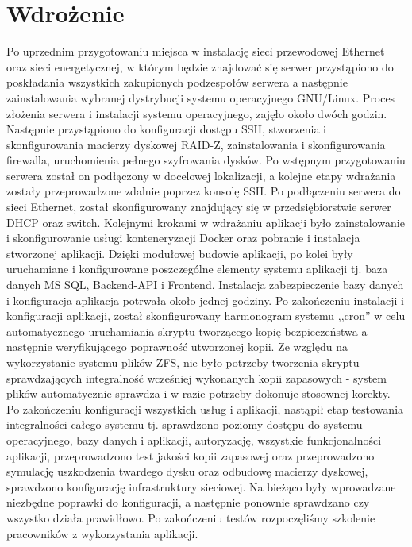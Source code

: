 \documentclass[12pt,a4paper]{article}
\begin{document}
	\section{Wdrożenie}
		\indent Po uprzednim przygotowaniu miejsca w instalację sieci przewodowej Ethernet oraz sieci energetycznej, w którym będzie znajdować się serwer  przystąpiono
		do poskładania wszystkich zakupionych podzespołów serwera a następnie zainstalowania wybranej dystrybucji systemu operacyjnego GNU/Linux. Proces złożenia serwera i instalacji
		systemu operacyjnego, zajęło około dwóch godzin. Następnie przystąpiono do konfiguracji dostępu SSH, stworzenia i skonfigurowania macierzy dyskowej RAID-Z,
		zainstalowania i skonfigurowania firewalla, uruchomienia pełnego szyfrowania dysków. Po wstępnym przygotowaniu serwera został on podłączony w docelowej lokalizacji, a kolejne etapy
		wdrażania zostały przeprowadzone zdalnie poprzez konsolę SSH. Po podłączeniu serwera do sieci Ethernet, został skonfigurowany znajdujący się w przedsiębiorstwie serwer DHCP
		oraz switch. Kolejnymi krokami w wdrażaniu aplikacji było zainstalowanie i skonfigurowanie usługi konteneryzacji Docker oraz pobranie i instalacja stworzonej aplikacji.
		Dzięki modułowej budowie aplikacji, po kolei były uruchamiane i konfigurowane poszczególne elementy systemu aplikacji tj. baza danych MS SQL, Backend-API i Frontend.
		Instalacja zabezpieczenie bazy danych i konfiguracja aplikacja potrwała około jednej godziny. Po zakończeniu instalacji i konfiguracji aplikacji, został skonfigurowany 
		harmonogram systemu ,,cron'' w celu automatycznego uruchamiania skryptu tworzącego kopię bezpieczeństwa a następnie weryfikującego poprawność utworzonej kopii.
		Ze względu na wykorzystanie systemu plików ZFS, nie było potrzeby tworzenia skryptu sprawdzających integralność wcześniej wykonanych kopii zapasowych
		- system plików automatycznie sprawdza i w razie potrzeby dokonuje stosownej korekty. Po zakończeniu konfiguracji wszystkich usług i aplikacji,
		nastąpił etap testowania integralności całego systemu tj. sprawdzono poziomy dostępu do systemu operacyjnego, bazy danych i aplikacji, autoryzację, wszystkie funkcjonalności aplikacji,
		przeprowadzono test jakości kopii zapasowej oraz przeprowadzono symulację uszkodzenia twardego dysku oraz odbudowę macierzy dyskowej,
		sprawdzono konfigurację infrastruktury sieciowej. Na bieżąco były wprowadzane niezbędne poprawki do konfiguracji, a następnie ponownie sprawdzano czy wszystko działa prawidłowo.
		Po zakończeniu testów rozpoczęliśmy szkolenie pracowników z wykorzystania aplikacji.
	\newpage
	
\end{document}
